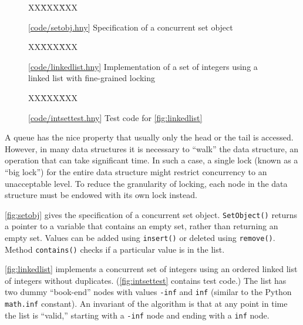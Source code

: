 \documentclass{report}
\newcommand{\harmonysource}[1]{
\begin{tabbing}
XX\=XXX\=XXX\kill
    
\end{tabbing}
}
\newcommand{\harmonylink}[1]{%
[\href{https://harmony.cs.cornell.edu/#1}{\underline{#1}}]%
}
\newenvironment{code}{
\tcolorbox
}{
\endtcolorbox
}
\begin{document}
\begin{figure}
\begin{code}
\harmonysource{setobj}
\end{code}
\caption{\harmonylink{code/setobj.hny} Specification of a concurrent
set object}
\label{fig:setobj}
\end{figure}

\begin{figure}
\begin{code}
\harmonysource{linkedlist}
\end{code}
\caption{\harmonylink{code/linkedlist.hny} Implementation of a set of integers using a linked list with fine-grained locking}
\label{fig:linkedlist}
\end{figure}

\begin{figure}
\begin{code}
\harmonysource{intsettest}
\end{code}
\caption{\harmonylink{code/intsettest.hny} Test code for \autoref{fig:linkedlist}}
\label{fig:intsettest}
\end{figure}

%
%
%
%
A queue has the nice property that usually only the head or the tail is accessed.
However, in many data structures it is necessary to ``walk'' the data structure,
an operation that can take significant time.
In such a case, a single lock (known as a ``big lock'')
for the entire data structure might restrict concurrency to an unacceptable level.
To reduce the granularity of locking, each node in the data structure must be
endowed with its own lock instead.

\autoref{fig:setobj} gives the specification of a concurrent set object.
\texttt{SetObject()} returns a pointer to a variable that
contains an empty set, rather than returning an empty set.
Values can be added using \texttt{insert()} or deleted using \texttt{remove()}.
Method \texttt{contains()} checks if a particular value is in the list.

\autoref{fig:linkedlist} implements a concurrent set of integers using
an ordered linked list of integers without duplicates.
(\autoref{fig:intsettest} contains test code.)
The list has two dummy ``book-end'' nodes with values \texttt{-inf} and
\texttt{inf} (similar to the Python \texttt{math.inf} constant).
An invariant of the algorithm is that at any point in time the
list is ``valid,'' starting with a \texttt{-inf} node and ending
with a \texttt{inf} node.
\end{document}
